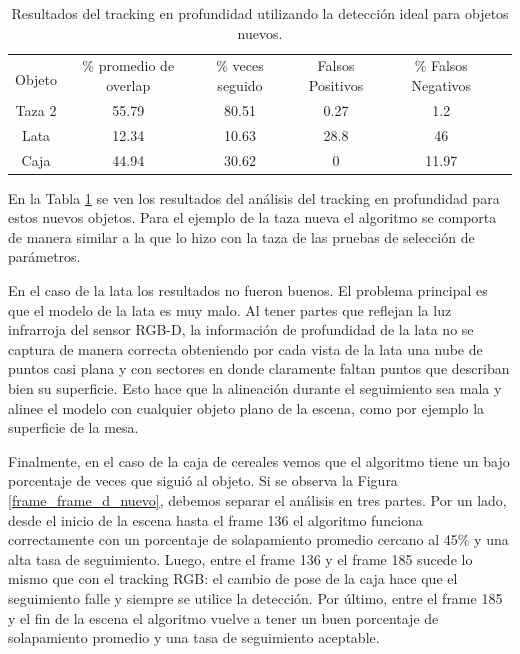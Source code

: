 \begin{table}[h]
	\centering
    \begin{tabular}{|c|c|c|c|c|c|}
    \hline
    & \multirow{2}{2.4cm}{\% promedio de overlap} & \multirow{2}{2cm}{\% veces seguido} & \multirow{2}{1.6cm}{Falsos Positivos} & \multirow{2}{1.6cm}{\% Falsos Negativos}\\
	Objeto & & & &\\
    \hline
    Taza 2  & 55.79      & 80.51     & 0.27     &   1.2 \\
    \hline
    Lata    & 12.34      & 10.63     & 28.8     &    46 \\
    \hline
    Caja    & 44.94      & 30.62     & 0        & 11.97 \\
    \hline
    \end{tabular}
\caption{Resultados del tracking en profundidad utilizando la detección ideal para objetos nuevos.}
\label{tabla_d_nuevos}
\end{table}

En la Tabla \ref{tabla_d_nuevos} se ven los resultados del análisis del tracking en profundidad para estos nuevos objetos.
Para el ejemplo de la taza nueva el algoritmo se comporta de manera similar a la que lo hizo con la taza de las pruebas de selección de parámetros.

En el caso de la lata los resultados no fueron buenos. El problema principal es que el modelo de la lata es muy malo. Al tener partes que reflejan la luz infrarroja del sensor RGB-D, la información de profundidad de la lata no se captura de manera correcta obteniendo por cada vista de la lata una nube de puntos casi plana y con sectores en donde claramente faltan puntos que describan bien su superficie. Esto hace que la alineación durante el seguimiento sea mala y alinee el modelo con cualquier objeto plano de la escena, como por ejemplo la superficie de la mesa.

Finalmente, en el caso de la caja de cereales vemos que el algoritmo tiene un bajo porcentaje de veces que siguió al objeto. Si se observa la Figura \ref{frame_frame_d_nuevo}, debemos separar el análisis en tres partes. Por un lado, desde el inicio de la escena hasta el frame 136 el algoritmo funciona correctamente con un porcentaje de solapamiento promedio cercano al 45\% y una alta tasa de seguimiento. Luego, entre el frame 136 y el frame 185 sucede lo mismo que con el tracking RGB: el cambio de pose de la caja hace que el seguimiento falle y siempre se utilice la detección. Por último, entre el frame 185 y el fin de la escena el algoritmo vuelve a tener un buen porcentaje de solapamiento promedio y una tasa de seguimiento aceptable.

